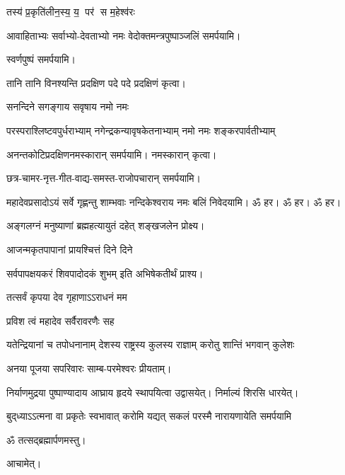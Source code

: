 \begin{center}
{तस्य॑ प्र॒कृति॑लीन॒स्य॒ य॒ पर॑ स म॒हेश्व॑रः}
\medskip

आवाहिताभ्यः सर्वाभ्यो-देवताभ्यो नमः वेदोक्तमन्त्रपुष्पाञ्जलिं समर्पयामि।\medskip

स्वर्णपुष्पं समर्पयामि।\medskip


{तानि तानि विनश्यन्ति प्रदक्षिण पदे पदे}
प्रदक्षिणं कृत्वा।\medskip

{सनन्दिने सगङ्गाय सवृषाय नमो नमः}

{परस्पराश्लिष्टवपुर्धराभ्याम्‌}
{नगेन्द्रकन्यावृषकेतनाभ्याम्‌}
{नमो नमः शङ्करपार्वतीभ्याम्‌}%

अनन्तकोटिप्रदक्षिणनमस्कारान् समर्पयामि। नमस्कारान् कृत्वा।\medskip

छत्र-चामर-नृत्त-गीत-वाद्य-समस्त-राजोपचारान् समर्पयामि।\medskip


{महादेवप्रसादोऽयं सर्वे गृह्णन्तु शाम्भवाः}
नन्दिकेश्वराय नमः बलिं निवेदयामि। ॐ हर। ॐ हर। ॐ हर।\medskip

{अङ्गलग्नं मनुष्याणां ब्रह्महत्यायुतं दहेत्}
शङ्खजलेन प्रोक्ष्य।

{आजन्मकृतपापानां प्रायश्चित्तं दिने दिने}

{सर्वपापक्षयकरं शिवपादोदकं शुभम्}
इति अभिषेकतीर्थं प्राश्य।

{तत्सर्वं कृपया देव गृहाणाऽऽराधनं मम}

{प्रविश त्वं महादेव सर्वैरावरणैः सह}

{यतेन्द्रियानां च तपोधनानाम्}
{देशस्य राष्ट्रस्य कुलस्य राज्ञाम्}
{करोतु शान्तिं भगवान् कुलेशः}


अनया पूजया सपरिवारः साम्ब-परमेश्वरः प्रीयताम्। 



निर्याणमुद्रया पुष्पाण्यादाय आघ्राय हृदये स्थापयित्वा उद्वासयेत्। निर्माल्यं शिरसि धारयेत्।


{बुद्‌ध्याऽऽत्मना वा प्रकृतेः स्वभावात्}
{करोमि यद्यत् सकलं परस्मै}
{नारायणायेति समर्पयामि}


ॐ तत्सद्ब्रह्मार्पणमस्तु।\medskip

आचामेत्।

\end{center}
\closesection
\clearpage